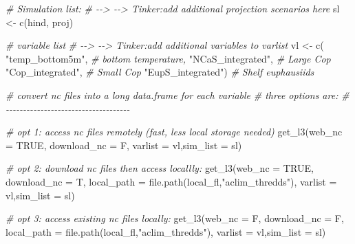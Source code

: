 \documentclass[
]{article}
\newenvironment{Shaded}{\begin{snugshade}}{\end{snugshade}}
\newcommand{\AttributeTok}[1]{\textcolor[rgb]{0.77,0.63,0.00}{#1}}
\newcommand{\CommentTok}[1]{\textcolor[rgb]{0.56,0.35,0.01}{\textit{#1}}}
\newcommand{\ConstantTok}[1]{\textcolor[rgb]{0.00,0.00,0.00}{#1}}
\newcommand{\FunctionTok}[1]{\textcolor[rgb]{0.00,0.00,0.00}{#1}}
\newcommand{\NormalTok}[1]{#1}
\newcommand{\OtherTok}[1]{\textcolor[rgb]{0.56,0.35,0.01}{#1}}
\newcommand{\StringTok}[1]{\textcolor[rgb]{0.31,0.60,0.02}{#1}}
\begin{document}
\begin{Shaded}
\begin{Highlighting}[]
    \CommentTok{\# Simulation list:}
    \CommentTok{\# {-}{-}\textgreater{} {-}{-}\textgreater{} Tinker:add additional projection scenarios here}
\NormalTok{    sl }\OtherTok{\textless{}{-}} \FunctionTok{c}\NormalTok{(hind, proj)}
    
    \CommentTok{\# variable list}
    \CommentTok{\# {-}{-}\textgreater{} {-}{-}\textgreater{} Tinker:add additional variables to varlist}
\NormalTok{    vl }\OtherTok{\textless{}{-}} \FunctionTok{c}\NormalTok{(}
              \StringTok{"temp\_bottom5m"}\NormalTok{,    }\CommentTok{\# bottom temperature,}
              \StringTok{"NCaS\_integrated"}\NormalTok{,  }\CommentTok{\# Large Cop}
              \StringTok{"Cop\_integrated"}\NormalTok{,   }\CommentTok{\# Small Cop}
              \StringTok{"EupS\_integrated"}\NormalTok{)  }\CommentTok{\# Shelf  euphausiids}
    
    \CommentTok{\# convert  nc files into a long data.frame for each variable}
    \CommentTok{\# three options are:}
    \CommentTok{\# {-}{-}{-}{-}{-}{-}{-}{-}{-}{-}{-}{-}{-}{-}{-}{-}{-}{-}{-}{-}{-}{-}{-}{-}{-}{-}{-}{-}{-}{-}{-}{-}{-}{-}{-}{-}}
    
    \CommentTok{\# opt 1: access nc files remotely (fast, less local storage needed)}
    \FunctionTok{get\_l3}\NormalTok{(}\AttributeTok{web\_nc =} \ConstantTok{TRUE}\NormalTok{, }\AttributeTok{download\_nc =}\NormalTok{ F,}
          \AttributeTok{varlist =}\NormalTok{ vl,}\AttributeTok{sim\_list =}\NormalTok{ sl)}
    
    \CommentTok{\# opt 2:  download nc files then access locallly:}
    \FunctionTok{get\_l3}\NormalTok{(}\AttributeTok{web\_nc =} \ConstantTok{TRUE}\NormalTok{, }\AttributeTok{download\_nc =}\NormalTok{ T,}
          \AttributeTok{local\_path =} \FunctionTok{file.path}\NormalTok{(local\_fl,}\StringTok{"aclim\_thredds"}\NormalTok{),}
          \AttributeTok{varlist =}\NormalTok{ vl,}\AttributeTok{sim\_list =}\NormalTok{ sl)}
    
     \CommentTok{\# opt 3:  access existing nc files locally:}
    \FunctionTok{get\_l3}\NormalTok{(}\AttributeTok{web\_nc =}\NormalTok{ F, }\AttributeTok{download\_nc =}\NormalTok{ F,}
          \AttributeTok{local\_path =} \FunctionTok{file.path}\NormalTok{(local\_fl,}\StringTok{"aclim\_thredds"}\NormalTok{),}
          \AttributeTok{varlist =}\NormalTok{ vl,}\AttributeTok{sim\_list =}\NormalTok{ sl)}
\end{Highlighting}
\end{Shaded}
\end{document}
